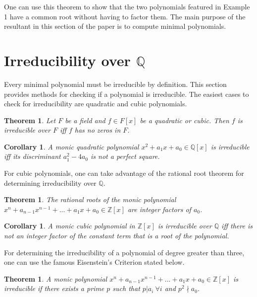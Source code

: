 \documentclass{article}
\newtheorem*{Definition: Sylvester Matrix}{Definition}
\newtheorem*{Definition: Resultant 1}{Definition 1}
\newtheorem*{Definition: Resultant 2}{Definition 2}
\newtheorem*{Theorem: Resultant proves shared roots}{Theorem 1}
\newtheorem*{Theorem: Minimal polynomial for beta}{Theorem 2}
\newtheorem*{Example: Sylvester Matrix Ex}{Example}
\newtheorem*{Theorem: Roots}{Theorem}
\newtheorem*{Corollary: Discriminant}{Corollary}
\newtheorem*{Theorem: Rational Root Theorem}{Theorem}
\newtheorem*{Corollary: Cubic Irreducibility}{Corollary}
\newtheorem*{Theorem: Eisenstein Criterion}{Theorem}
\newtheorem*{Theorem: mod p Test}{Theorem}
\newtheorem*{Theorem: Rabin's algorithm}{Theorem}
\newtheorem*{Theorem: gcd finite field}{Theorem}
\newtheorem*{Theorem: Gauss Irreducibles}{Theorem}
\newtheorem*{Theorem: Number of irreducibles}{Theorem}
\newtheorem*{Example: All irreducibles in Z_2}{Example}
\newtheorem*{Formula: Minimal polynomial for r root of a}{Formula 1}
\newtheorem*{Example: minimal polynomial for sqrt(p)}{Example}
\newtheorem*{Example: Golden Ratio}{Example}
\newtheorem*{Formula: Minimal polynomial for a+b}{Formula 2}
\newtheorem*{Example: 1 + sqrt(3)}{Example}
\newtheorem*{Example: cubic root of unity}{Example}
\newtheorem*{Formula: Minimal polynomial for a/b}{Formula 3}
\newtheorem*{Formula: Minimal polynomial for ab}{Formula 4}
\newtheorem*{Example: cubrt(4)/i+1}{Example}
\newtheorem*{Example: 5zeta}{Example}
\newtheorem*{Example: Wild one}{Example}
\begin{document}
One can use this theorem to show that the two polynomials featured in Example 1 have a common root without having to factor them. The main purpose of the resultant in this section of the paper is to compute minimal polynomials.

\section{Irreducibility over $\mathbb{Q}$}

Every minimal polynomial must be irreducible by definition. This section provides methods for checking if a polynomial is irreducible. The easiest cases to check for irreducibility are quadratic and cubic polynomials.

\begin{Theorem: Roots}
Let $F$ be a field and $f \in F[x]$ be a quadratic or cubic. Then $f$ is irreducible over $F$ iff $f$ has no zeros in $F$. 
\end{Theorem: Roots} 

\begin{Corollary: Discriminant}
A monic quadratic polynomial $x^2+a_1x+a_0 \in \mathbb{Q}[x]$ is irreducible iff its discriminant $a_1^2-4a_0$ is not a perfect square. 
\end{Corollary: Discriminant}

For cubic polynomials, one can take advantage of the rational root theorem for determining irreducibility over $\mathbb{Q}$.

\begin{Theorem: Rational Root Theorem}
The rational roots of the monic polynomial $x^n+a_{n-1}x^{n-1}+...+a_1x+a_0 \in \mathbb{Z}[x]$ are integer factors of $a_0$.
\end{Theorem: Rational Root Theorem}

\begin{Corollary: Cubic Irreducibility}
A monic cubic polynomial in $\mathbb{Z}[x]$ is irreducible over $\mathbb{Q}$ iff there is not an integer factor of the constant term that is a root of the polynomial.
\end{Corollary: Cubic Irreducibility}

For determining the irreducibility of a polynomial of degree greater than three, one can use the famous Eisenstein's Criterion stated below. 

\begin{Theorem: Eisenstein Criterion}
A monic polynomial $x^n+a_{n-1}x^{n-1}+...+a_1x+a_0 \in \mathbb{Z}[x]$ is irreducible if there exists a prime $p$ such that $p|a_i \ \forall  i$ and $p^2 \nmid a_0$.
\end{Theorem: Eisenstein Criterion}
\end{document}
